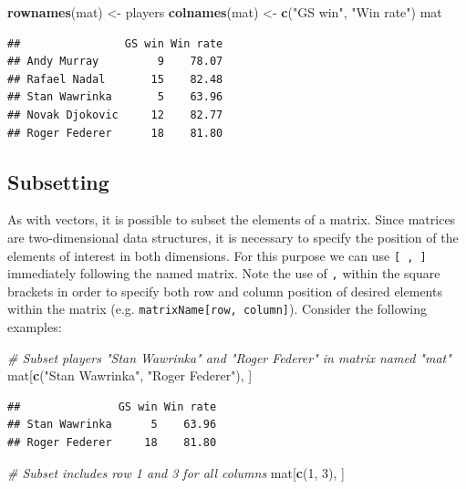 \documentclass[12pt,]{krantz}
\newenvironment{Shaded}{\begin{snugshade}}{\end{snugshade}}
\newcommand{\KeywordTok}[1]{\textcolor[rgb]{0.27,0.27,0.27}{\textbf{#1}}}
\newcommand{\DecValTok}[1]{\textcolor[rgb]{0.06,0.06,0.06}{#1}}
\newcommand{\StringTok}[1]{\textcolor[rgb]{0.5,0.5,0.5}{#1}}
\newcommand{\CommentTok}[1]{\textcolor[rgb]{0.37,0.37,0.37}{\textit{#1}}}
\newcommand{\NormalTok}[1]{#1}
\begin{document}
\begin{Shaded}
\begin{Highlighting}[]
\KeywordTok{rownames}\NormalTok{(mat) <-}\StringTok{ }\NormalTok{players}
\KeywordTok{colnames}\NormalTok{(mat) <-}\StringTok{ }\KeywordTok{c}\NormalTok{(}\StringTok{"GS win"}\NormalTok{, }\StringTok{"Win rate"}\NormalTok{)}
\NormalTok{mat}
\end{Highlighting}
\end{Shaded}

\begin{verbatim}
##                GS win Win rate
## Andy Murray         9    78.07
## Rafael Nadal       15    82.48
## Stan Wawrinka       5    63.96
## Novak Djokovic     12    82.77
## Roger Federer      18    81.80
\end{verbatim}

\subsection{Subsetting}\label{subsetting-1}

As with vectors, it is possible to subset the elements of a matrix.
Since matrices are two-dimensional data structures, it is necessary to
specify the position of the elements of interest in both dimensions. For
this purpose we can use \texttt{{[}\ ,\ {]}} immediately following the
named matrix. Note the use of \texttt{,} within the square brackets in
order to specify both row and column position of desired elements within
the matrix (e.g. \texttt{matrixName{[}row,\ column{]}}). Consider the
following examples:

\begin{Shaded}
\begin{Highlighting}[]
\CommentTok{# Subset players "Stan Wawrinka" and "Roger Federer" in matrix named "mat"}
\NormalTok{mat[}\KeywordTok{c}\NormalTok{(}\StringTok{"Stan Wawrinka"}\NormalTok{, }\StringTok{"Roger Federer"}\NormalTok{), ]}
\end{Highlighting}
\end{Shaded}

\begin{verbatim}
##               GS win Win rate
## Stan Wawrinka      5    63.96
## Roger Federer     18    81.80
\end{verbatim}

\begin{Shaded}
\begin{Highlighting}[]
\CommentTok{# Subset includes row 1 and 3 for all columns }
\NormalTok{mat[}\KeywordTok{c}\NormalTok{(}\DecValTok{1}\NormalTok{, }\DecValTok{3}\NormalTok{), ]}
\end{Highlighting}
\end{Shaded}
\end{document}
